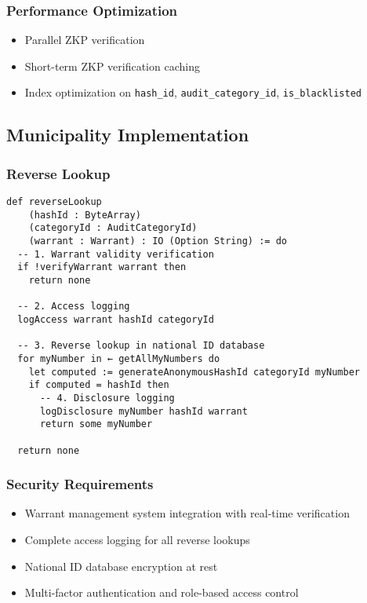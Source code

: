 \subsubsection{Performance Optimization}

\begin{itemize}
  \item Parallel ZKP verification
  \item Short-term ZKP verification caching
  \item Index optimization on \texttt{hash\_id}, \texttt{audit\_category\_id}, \texttt{is\_blacklisted}
\end{itemize}

\subsection{Municipality Implementation}

\subsubsection{Reverse Lookup}

\begin{lstlisting}[language=Lean]
def reverseLookup
    (hashId : ByteArray)
    (categoryId : AuditCategoryId)
    (warrant : Warrant) : IO (Option String) := do
  -- 1. Warrant validity verification
  if !verifyWarrant warrant then
    return none

  -- 2. Access logging
  logAccess warrant hashId categoryId

  -- 3. Reverse lookup in national ID database
  for myNumber in ← getAllMyNumbers do
    let computed := generateAnonymousHashId categoryId myNumber
    if computed = hashId then
      -- 4. Disclosure logging
      logDisclosure myNumber hashId warrant
      return some myNumber

  return none
\end{lstlisting}

\subsubsection{Security Requirements}

\begin{itemize}
  \item Warrant management system integration with real-time verification
  \item Complete access logging for all reverse lookups
  \item National ID database encryption at rest
  \item Multi-factor authentication and role-based access control
\end{itemize}


